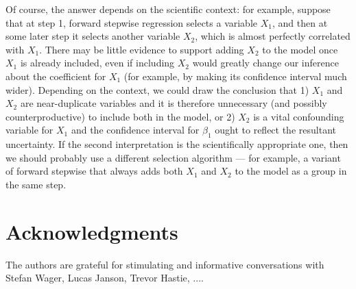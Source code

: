 \documentclass{article}
\begin{document}
Of course, the answer depends on the scientific context: for example, suppose that at step 1, forward stepwise regression selects a variable $X_1$, and then at some later step it selects another variable $X_2$, which is almost perfectly correlated with $X_1$. There may be little evidence to support adding $X_2$ to the model once $X_1$ is already included, even if including $X_2$ would greatly change our inference about the coefficient for $X_1$ (for example, by making its confidence interval much wider). Depending on the context, we could draw the conclusion that 1) $X_1$ and $X_2$ are near-duplicate variables and it is therefore unnecessary (and possibly counterproductive) to include both in the model, or 2) $X_2$ is a vital confounding variable for $X_1$ and the confidence interval for $\beta_1$ ought to reflect the resultant uncertainty. If the second interpretation is the scientifically appropriate one, then we should probably use a different selection algorithm --- for example, a variant of forward stepwise that always adds both $X_1$ and $X_2$ to the model as a group in the same step.




\section*{Acknowledgments}

The authors are grateful for stimulating and informative conversations with Stefan Wager, Lucas Janson, Trevor Hastie, ....



\end{document}
